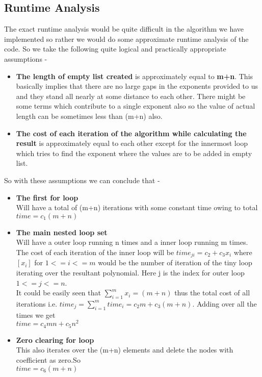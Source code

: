 \documentclass[20pt]{article}
\begin{document}
\subsection{Runtime Analysis}
The exact runtime analysis would be quite difficult in the algorithm we have implemented so rather we would do some approximate runtime analysis of the code.
So we take the following quite logical and practically appropriate assumptions -

\begin{itemize}
\item \textbf{The length of empty list created} is approximately equal to \textbf{m+n}. This basically implies that there are no large gaps in the exponents provided to us and they stand all nearly at some distance to each other. There might be some terms which contribute to a single exponent also so the value of actual length can be sometimes less than (m+n) also.
\item \textbf{The cost of each iteration of the algorithm while calculating the result} is approximately equal to each other except for the innermost loop which tries to find the exponent where the values are to be added in empty list.
\end{itemize}

So with these assumptions we can conclude that -
\begin{itemize}
\item \textbf{The first for loop} \\
Will have a total of (m+n) iterations with some constant time owing to total \\
\textbf{$ time = c_1(m+n) $}

\item \textbf{The main nested loop set} \\
Will have a outer loop running n times and a inner loop running m times. The cost of each iteration of the inner loop will be $ time_{ji} = c_2 + c_3x_i $  where  $[x_i]$ for $ 1 <= i <= m$ would be the number of iteration of the tiny loop iterating over the resultant polynomial. Here j is the index for outer loop $ 1 <= j <= n $. \\
It could be easily seen that  $ \sum _{i=1}^{m} {x_i} = (m+n) $ thus the total cost of all iterations  i.e. $ time_j = \sum _{i=1}^{m} {time_i} = c_2m + c_3(m+n) $.
Adding over all the times we get  \\
\textbf{$ time = c_4mn + c_5n^2$}

\item \textbf{Zero clearing for loop} \\
This also iterates over the (m+n) elements and delete the nodes with coefficient as zero.So \\
\textbf{$ time = c_6(m+n) $}
\end{itemize}
\end{document}
